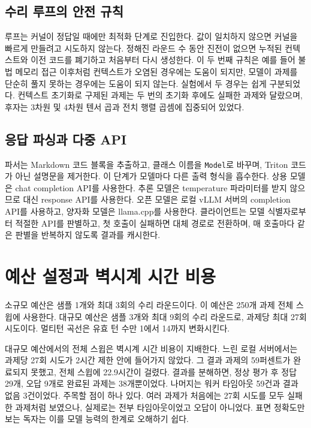 \subsection{수리 루프의 안전 규칙}
루프는 커널이 정답일 때에만 최적화 단계로 진입한다. 값이 일치하지 않으면 커널을 빠르게 만들려고
시도하지 않는다. 정해진 라운드 수 동안 진전이 없으면 누적된 컨텍스트와 이전 코드를 폐기하고
처음부터 다시 생성한다. 이 두 번째 규칙은 예를 들어 불법 메모리 접근 이후처럼 컨텍스트가 오염된
경우에는 도움이 되지만, 모델이 과제를 단순히 풀지 못하는 경우에는 도움이 되지 않는다. 실험에서
두 경우는 쉽게 구분되었다. 컨텍스트 초기화로 구제된 과제는 두 번의 초기화 후에도 실패한 과제와
달랐으며, 후자는 3차원 및 4차원 텐서 곱과 전치 행렬 곱셈에 집중되어 있었다.

\subsection{응답 파싱과 다중 API}
파서는 Markdown 코드 블록을 추출하고, 클래스 이름을 \texttt{Model}로 바꾸며, Triton 코드가 아닌
설명문을 제거한다. 이 단계가 모델마다 다른 출력 형식을 흡수한다. 상용 모델은 chat completion
API를 사용한다. 추론 모델은 temperature 파라미터를 받지 않으므로 대신 response API를 사용한다.
오픈 모델은 로컬 vLLM 서버의 completion API를 사용하고, 양자화 모델은 llama.cpp를 사용한다.
클라이언트는 모델 식별자로부터 적절한 API를 판별하고, 첫 호출이 실패하면 대체 경로로 전환하며,
매 호출마다 같은 판별을 반복하지 않도록 결과를 캐시한다.

\section{예산 설정과 벽시계 시간 비용}\label{sec:app-budget}

소규모 예산은 샘플 1개와 최대 3회의 수리 라운드이다. 이 예산은 250개 과제 전체 스윕에 사용한다.
대규모 예산은 샘플 3개와 최대 9회의 수리 라운드로, 과제당 최대 27회 시도이다. 멀티턴 곡선은
유효 턴 수만 1에서 14까지 변화시킨다.

대규모 예산에서의 전체 스윕은 벽시계 시간 비용이 지배한다. 느린 로컬 서버에서는 과제당 27회
시도가 2시간 제한 안에 들어가지 않았다. 그 결과 과제의 59퍼센트가 완료되지 못했고, 전체 스윕에
22.9시간이 걸렸다. 결과를 분해하면, 정상 평가 후 정답 29개, 오답 9개로 완료된 과제는 38개뿐이었다.
나머지는 워커 타임아웃 59건과 결과 없음 3건이었다. 주목할 점이 하나 있다. 여러 과제가 처음에는
27회 시도를 모두 실패한 과제처럼 보였으나, 실제로는 전부 타임아웃이었고 오답이 아니었다. 표면
정확도만 보는 독자는 이를 모델 능력의 한계로 오해하기 쉽다.

